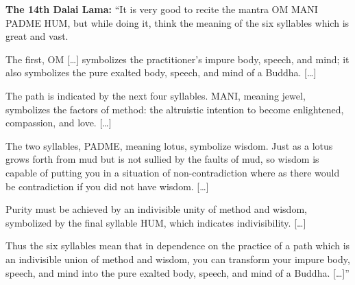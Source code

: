   \begin{explanation}
    \textbf{The 14th Dalai Lama:} ``It is very good to recite the mantra OM
    MANI PADME HUM, but while doing it, think the meaning of the six syllables
    which is great and vast.
    \par
    The first, OM [\ldots] symbolizes the practitioner's impure body, speech,
    and mind; it also symbolizes the pure exalted body, speech, and mind of a
    Buddha. [\ldots]
    \par
    The path is indicated by the next four syllables. MANI, meaning jewel,
    symbolizes the factors of method: the altruistic intention to become
    enlightened, compassion, and love. [\ldots]
    \par
    The two syllables, PADME, meaning lotus, symbolize wisdom. Just as a lotus
    grows forth from mud but is not sullied by the faults of mud, so wisdom is
    capable of putting you in a situation of non-contradiction where as there
    would be contradiction if you did not have wisdom. [\ldots]
    \par
    Purity must be achieved by an indivisible unity of method and wisdom,
    symbolized by the final syllable HUM, which indicates indivisibility. [\ldots]
    \par
    Thus the six syllables mean that in dependence on the practice of a path
    which is an indivisible union of method and wisdom, you can transform your
    impure body, speech, and mind into the pure exalted body, speech, and mind
    of a Buddha. [\ldots]''
  \end{explanation}
\endsong


